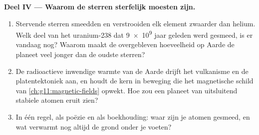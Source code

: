 \begin{problem}
\medskip
\noindent\textbf{Deel IV --- Waarom de sterren sterfelijk moesten zijn.}
\begin{enumerate}[resume]
  \item Stervende sterren smeedden en verstrooiden elk element zwaarder
        dan helium. Welk deel van het uranium-238 dat \num{9e9} jaar
        geleden werd gesmeed, is er vandaag nog? Waarom maakt de
        overgebleven hoeveelheid op Aarde de planeet veel jonger dan de
        oudste sterren?
  \item De radioactieve inwendige warmte van de Aarde drijft het
        vulkanisme en de platentektoniek aan, en houdt de kern in beweging
        die het magnetische schild van \cref{ch:g11:magnetic-fields}
        opwekt. Hoe zou een planeet van uitsluitend stabiele atomen eruit
        zien?
  \item In één regel, als poëzie en als boekhouding: waar zijn je atomen
        gesmeed, en wat verwarmt nog altijd de grond onder je voeten?
\end{enumerate}
\end{problem}
